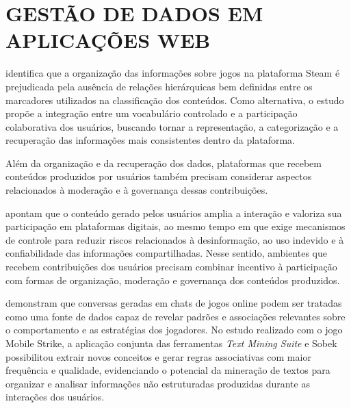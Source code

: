 \section{GESTÃO DE DADOS EM APLICAÇÕES WEB}

 identifica que a organização das informações sobre jogos na plataforma Steam é prejudicada pela ausência de relações hierárquicas bem definidas entre os marcadores utilizados na classificação dos conteúdos. Como alternativa, o estudo propõe a integração entre um vocabulário controlado e a participação colaborativa dos usuários, buscando tornar a representação, a categorização e a recuperação das informações mais consistentes dentro da plataforma.

Além da organização e da recuperação dos dados, plataformas que recebem conteúdos produzidos por usuários também precisam considerar aspectos relacionados à moderação e à governança dessas contribuições.

 apontam que o conteúdo gerado pelos usuários amplia a interação e valoriza sua participação em plataformas digitais, ao mesmo tempo em que exige mecanismos de controle para reduzir riscos relacionados à desinformação, ao uso indevido e à confiabilidade das informações compartilhadas. Nesse sentido, ambientes que recebem contribuições dos usuários precisam combinar incentivo à participação com formas de organização, moderação e governança dos conteúdos produzidos.

 demonstram que conversas geradas em chats de jogos online podem ser tratadas como uma fonte de dados capaz de revelar padrões e associações relevantes sobre o comportamento e as estratégias dos jogadores. No estudo realizado com o jogo Mobile Strike, a aplicação conjunta das ferramentas \textit{Text Mining Suite} e Sobek possibilitou extrair novos conceitos e gerar regras associativas com maior frequência e qualidade, evidenciando o potencial da mineração de textos para organizar e analisar informações não estruturadas produzidas durante as interações dos usuários.
